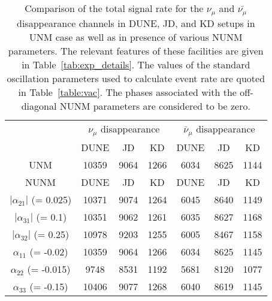 \documentclass[11pt,a4paper]{article}
\newcommand{\capdef}{}
\newcommand{\mycaption}[2][\capdef]{\renewcommand{\capdef}{#2}
	\caption[#1]{{\footnotesize #2}}}
\begin{document}
\begin{table}
	
	\centering
	
	\begin{tabular}{|ccc|*{6}{c|}}
		
		\hline\hline
		
		\multicolumn{3}{|c|}{\multirow{2}{*}{}} & \multicolumn{3}{|c}{$\nu_\mu$ disappearance} & \multicolumn{3}{|c|}{$\bar\nu_\mu$ disappearance}\\ 
		
		\cline{4-9}
		
		\multicolumn{3}{|c|}{} & DUNE & JD & KD & DUNE & JD & KD \\
		
		\hline\hline
		
		\multicolumn{3}{|c|}{UNM} & 10359 & 9064 & 1266 & 6034 & 8625 & 1144 \\
		
		\cline{1-9}
		
		\hline\hline
		
		\multicolumn{3}{|c|}{NUNM} & DUNE & JD & KD & DUNE & JD & KD \\
		\hline\hline
		
		\multicolumn{3}{|c|}{$|\alpha_{21}|$ (= 0.025)} & 10371 &9074 & 1264 & 6045 & 8640 & 1149 \\
		\hline
		\multicolumn{3}{|c|}{$|\alpha_{31}|$ (= 0.1)} & 10351 & 9062 & 1261  & 6035 & 8627  & 1168\\
		\hline
		\multicolumn{3}{|c|}{$|\alpha_{32}|$ (= 0.25)} & 10978 & 9203 & 1255 & 6005 & 8467 & 1158\\
		\hline
		\multicolumn{3}{|c|}{$\alpha_{11}$ (= -0.02)} & 10359 & 9064 & 1266 & 6034 & 8625 & 1145 \\
		\hline
		\multicolumn{3}{|c|}{$\alpha_{22}$  (= -0.015)} & 9748 & 8531 & 1192 & 5681 & 8120 & 1077 \\
		\hline
		\multicolumn{3}{|c|}{$\alpha_{33}$ (= -0.15)} & 10406 & 9077 &  1268 & 6040 & 8619 & 1145 \\
		\hline
		\hline
		
	\end{tabular}
	
	\mycaption{Comparison of the total signal rate for the $\nu_{\mu}$ and $\bar{\nu_{\mu}}$ disappearance channels in DUNE, JD, and KD setups in UNM case as well as in presence of various NUNM parameters. The relevant features of these facilities are given in Table~\ref{tab:exp_details}. The values of the standard oscillation parameters used to calculate event rate are quoted in Table~\ref{table:vac}. The phases associated with the off-diagonal NUNM parameters are considered
			to be zero.}
	
	\label{tab:total_events_dis}
	
\end{table}
\end{document}
